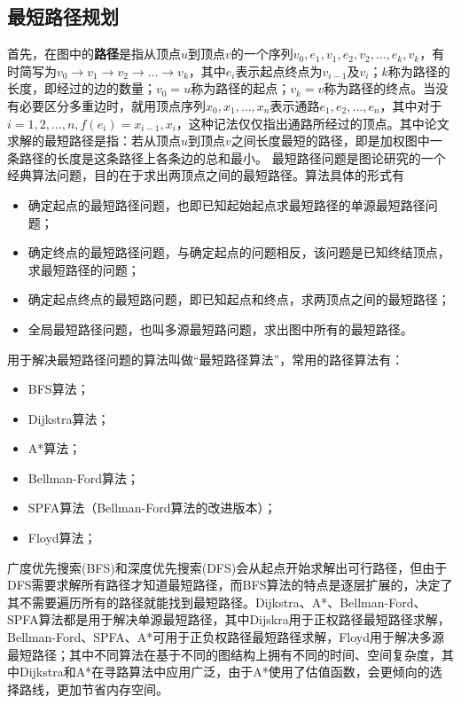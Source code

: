 \subsection{最短路径规划}
\par 首先，在图中的\textbf{路径}是指从顶点$u$到顶点$v$的一个序列$v_0,e_1,v_1,e_2,v_2,\dots,e_k,v_k$，有时简写为$v_0\rightarrow v_1\rightarrow v_2\rightarrow\dots\rightarrow v_k$，其中$e_i$表示起点终点为$v_{i-1}$及$v_i$；$k$称为路径的长度，即经过的边的数量；$v_0=u$称为路径的起点；$v_k=v$称为路径的终点。当没有必要区分多重边时，就用顶点序列$x_0,x_1,\dots, x_n$表示通路$e_1,e_2,\dots,e_n$，其中对于$i=1,2,\dots,n,f(e_i)={x_{i-1}, x_i}$，这种记法仅仅指出通路所经过的顶点。其中论文求解的最短路径是指：若从顶点$u$到顶点$v$之间长度最短的路径，即是加权图中一条路径的长度是这条路径上各条边的总和最小。
最短路径问题是图论研究的一个经典算法问题，目的在于求出两顶点之间的最短路径。算法具体的形式有
\begin{itemize}
    \item 确定起点的最短路径问题，也即已知起始起点求最短路径的单源最短路径问题；
    \item 确定终点的最短路径问题，与确定起点的问题相反，该问题是已知终结顶点，求最短路径的问题；
    \item 确定起点终点的最短路问题，即已知起点和终点，求两顶点之间的最短路径；
    \item 全局最短路径问题，也叫多源最短路问题，求出图中所有的最短路径。
\end{itemize}
\par 用于解决最短路径问题的算法叫做“最短路径算法”，常用的路径算法有：
\begin{itemize}
    \item BFS算法；
    \item Dijkstra算法；
    \item A*算法；
    \item Bellman-Ford算法；
    \item SPFA算法（Bellman-Ford算法的改进版本）；
    \item Floyd算法；
\end{itemize}
\par 广度优先搜索(BFS)和深度优先搜索(DFS)会从起点开始求解出可行路径，但由于DFS需要求解所有路径才知道最短路径，而BFS算法的特点是逐层扩展的，决定了其不需要遍历所有的路径就能找到最短路径。Dijkstra、A*、Bellman-Ford、SPFA算法都是用于解决单源最短路径，其中Dijskra用于正权路径最短路径求解，Bellman-Ford、SPFA、A*可用于正负权路径最短路径求解，Floyd用于解决多源最短路径；其中不同算法在基于不同的图结构上拥有不同的时间、空间复杂度，其中Dijkstra和A*在寻路算法中应用广泛，由于A*使用了估值函数，会更倾向的选择路线，更加节省内存空间。
